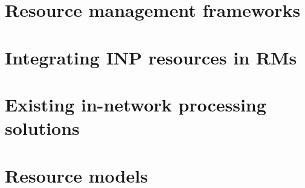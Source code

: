 

\section{Resource management frameworks}

\newpage

\section{Integrating INP resources in RMs}

\newpage

\section{Existing in-network processing solutions}

\newpage

\section{Resource models}
